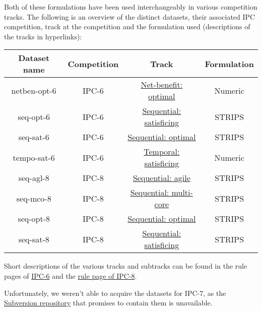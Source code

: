 \documentclass[10pt,a4paper,oneside]{article}
\begin{document}
Both of these formulations have been used interchangeably in various competition tracks.
The following is an overview of the distinct datasets, their associated IPC competition, track at the competition and the formulation used (descriptions of the tracks in hyperlinks):

\begin{center}
\begin{tabular}{c|c|c|c}
\textbf{Dataset name} & \textbf{Competition} & \textbf{Track} & \textbf{Formulation} \\ 
\hline 
\hline
netben-opt-6 & IPC-6 & \href{http://icaps-conference.org/ipc2008/deterministic/NetBenefitOptimization.html}{Net-benefit: optimal} & Numeric \\ 
seq-opt-6 & IPC-6 & \href{http://icaps-conference.org/ipc2008/deterministic/SequentialSatisficing.html}{Sequential: satisficing} & STRIPS \\ 
seq-sat-6 & IPC-6 & \href{http://icaps-conference.org/ipc2008/deterministic/SequentialOptimization.html}{Sequential: optimal} & STRIPS \\ 
tempo-sat-6 & IPC-6 & \href{http://icaps-conference.org/ipc2008/deterministic/TemporalSatisficing.html}{Temporal: satisficing} & Numeric \\ 
\hline 
seq-agl-8 & IPC-8 & \href{https://helios.hud.ac.uk/scommv/IPC-14/seqagi.html}{Sequential: agile} & STRIPS \\ 
seq-mco-8 & IPC-8 & \href{https://helios.hud.ac.uk/scommv/IPC-14/seqmulti.html}{Sequential: multi-core} & STRIPS \\ 
seq-opt-8 & IPC-8 & \href{https://helios.hud.ac.uk/scommv/IPC-14/seqopt.html}{Sequential: optimal} & STRIPS \\ 
seq-sat-8 & IPC-8 & \href{https://helios.hud.ac.uk/scommv/IPC-14/seqsat.html}{Sequential: satisficing} & STRIPS \\ 
\end{tabular} 
\end{center}

Short descriptions of the various tracks and subtracks can be found in the rule pages of
\href{https://helios.hud.ac.uk/scommv/IPC-14/rules.html}{IPC-6}
and the  \href{http://icaps-conference.org/ipc2008/deterministic/CompetitionRules.html}{rule page of IPC-8}.

Unfortunately, we weren't able to acquire the datasets for IPC-7, as the \href{http://www.plg.inf.uc3m.es/ipc2011-deterministic/Domains.html}{Subversion repository} that promises to contain them is unavailable.
\end{document}
